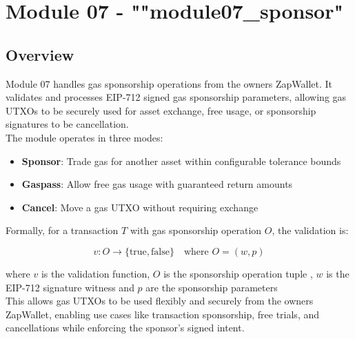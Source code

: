 \newpage
\section{Module 07 - {\ttfamily ""module07\_sponsor"}}
\label{sec:module07_predicate}

\subsection{Overview}
Module 07 handles gas sponsorship operations from the owners ZapWallet. It validates and processes EIP-712 signed
gas sponsorship parameters, allowing gas UTXOs to be securely used for asset exchange, free usage, or sponsorship signatures
to be cancellation.\\


The module operates in three modes:
\begin{itemize}
\item \textbf{Sponsor}: Trade gas for another asset within configurable tolerance bounds
\item \textbf{Gaspass}: Allow free gas usage with guaranteed return amounts
\item \textbf{Cancel}: Move a gas UTXO without requiring exchange
\end{itemize}



Formally, for a transaction $T$ with gas sponsorship operation $O$, the validation is:

\begin{equation*}
v: O \rightarrow \{\text{true}, \text{false}\} \quad \text{where } O = (w, p)
\end{equation*}



where $v$ is the validation function, $O$ is the sponsorship operation tuple , $w$ is the EIP-712 signature
witness and $p$ are the sponsorship parameters\\


This allows gas UTXOs to be used flexibly and securely from the owners ZapWallet, enabling use cases like
transaction sponsorship, free trials, and cancellations while enforcing the sponsor's signed intent.\\

